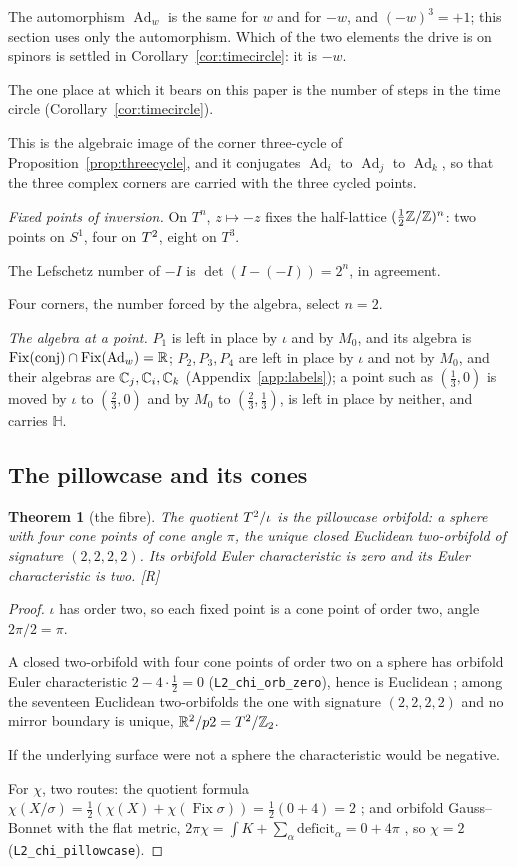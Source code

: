 \documentclass[11pt,a4paper]{article}
\theoremstyle{plain}
\newtheorem{theorem}{Theorem}[section]
\theoremstyle{definition}
\theoremstyle{remark}
\newcommand{\Hquat}{\mathbb{H}}
\newcommand{\Ad}{\operatorname{Ad}}
\newcommand{\Fix}{\operatorname{Fix}}
\newcommand{\rigR}{[\textup{R}]}
\begin{document}
The automorphism $\Ad_{w}$ is the same for $w$ and for $-w$, and $(-w)^{3}=+1$; this section uses only the automorphism. Which of the two elements the drive is on spinors is settled in Corollary~\ref{cor:timecircle}: it is $-w$.

The one place at which it bears on this paper is the number of steps in the time circle (Corollary~\ref{cor:timecircle}).

This is the algebraic image of the corner three-cycle of Proposition~\ref{prop:threecycle}, and it conjugates $\Ad_{i}$ to $\Ad_{j}$ to $\Ad_{k}$, so that the three complex corners are carried with the three cycled points.

\emph{Fixed points of inversion.} On $T^{n}$, $z\mapsto-z$ fixes the half-lattice $(\tfrac12\mathbb{Z}/\mathbb{Z})^{n}$: two points on $S^{1}$, four on $T^2$, eight on $T^{3}$.

The Lefschetz number of $-I$ is $\det(I-(-I))=2^{n}$, in agreement.

Four corners, the number forced by the algebra, select $n=2$.

\emph{The algebra at a point.} $P_{1}$ is left in place by $\iota$ and by $M_{0}$, and its algebra is $\Fix(\text{conj})\cap\Fix(\Ad_{w})=\R$; $P_{2},P_{3},P_{4}$ are left in place by $\iota$ and not by $M_{0}$, and their algebras are $\mathbb{C}_{j},\mathbb{C}_{i},\mathbb{C}_{k}$ (Appendix~\ref{app:labels}); a point such as $(\tfrac13,0)$ is moved by $\iota$ to $(\tfrac23,0)$ and by $M_{0}$ to $(\tfrac23,\tfrac13)$, is left in place by neither, and carries $\Hquat$.

\subsection{The pillowcase and its cones}

\begin{theorem}[the fibre]\label{thm:fibre}
The quotient $T^2/\iota$ is the pillowcase orbifold: a sphere with four cone points of cone angle $\pi$, the unique closed Euclidean two-orbifold of signature $(2,2,2,2)$. Its orbifold Euler characteristic is zero and its Euler characteristic is two. \rigR
\end{theorem}

\begin{proof}
$\iota$ has order two, so each fixed point is a cone point of order two, angle $2\pi/2=\pi$.

A closed two-orbifold with four cone points of order two on a sphere has orbifold Euler characteristic $2-4\cdot\tfrac12=0$ (\texttt{L2\_chi\_orb\_zero}), hence is Euclidean \cite{Thurston}; among the seventeen Euclidean two-orbifolds the one with signature $(2,2,2,2)$ and no mirror boundary is unique, $\mathbb{R}^{2}/p2=T^2/\mathbb{Z}_2$.

If the underlying surface were not a sphere the characteristic would be negative.

For $\chi$, two routes: the quotient formula $\chi(X/\sigma)=\tfrac12(\chi(X)+\chi(\Fix\sigma))=\tfrac12(0+4)=2$ \cite{Bredon}; and orbifold Gauss--Bonnet with the flat metric, $2\pi\chi=\int K+\sum_{\alpha}\mathrm{deficit}_{\alpha}=0+4\pi$ \cite{Satake}, so $\chi=2$ (\texttt{L2\_chi\_pillowcase}).
\end{proof}
\end{document}
